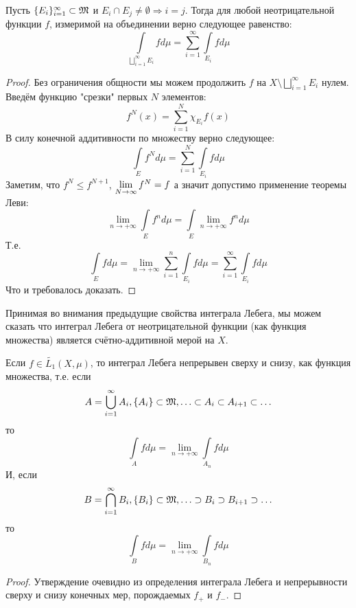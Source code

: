 \begin{theorem}
    Пусть $\{E_i\}_{i = 1}^\infty \subset \mathfrak{M}$ и $E_i \cap E_j \neq \emptyset \Rightarrow i = j$. Тогда для любой неотрицательной функции $f$, измеримой на объединении верно следующее равенство: \[\int\limits_{\bigsqcup\limits_{i = 1}^\infty E_i} fd\mu = \sum\limits_{i = 1}^\infty \int\limits_{E_i} fd\mu\]
\end{theorem}
\begin{proof}
    Без ограничения общности мы можем продолжить $f$ на $X \setminus \bigsqcup\limits_{i = 1}^\infty E_i$ нулем. Введём функцию "срезки" первых $N$ элементов: \[f^N(  x) = \sum\limits_{i = 1}^N \chi_{E_i}f(x)\]
    В силу конечной аддитивности по множеству верно следующее: \[\int\limits_E f^Nd\mu = \sum\limits_{i = 1}^N \int\limits_{E_i} fd\mu\]
    Заметим, что $f^N \leq f^{N + 1}$, $\lim\limits_{N \rightarrow \infty} f^N = f$ а значит допустимо применение теоремы Леви: \[\lim\limits_{n \rightarrow +\infty} \int\limits_{E} f^nd\mu = \int\limits_E \lim\limits_{n \rightarrow +\infty} f^n d\mu\]
    Т.е. \[\int\limits_E fd\mu = \lim\limits_{n \rightarrow +\infty} \sum\limits_{i = 1}^n \int\limits_{E_i} fd\mu = \sum\limits_{i = 1}^\infty \int\limits_{E_i} fd\mu\]
    Что и требовалось доказать.
\end{proof}

\begin{corollary}
    Принимая во внимания предыдущие свойства интеграла Лебега, мы можем сказать что интеграл Лебега от неотрицательной функции (как функция множества) является счётно-аддитивной мерой на $X$.
\end{corollary}

\begin{corollary}
    Если $f \in \widetilde{L_1}(X, \mu)$, то интеграл Лебега непрерывен сверху и снизу, как функция множества, т.е. если \[A = \bigcup\limits_{i = 1}^\infty A_i, \{A_i\} \subset \mathfrak{M}, \ldots \subset A_i \subset A_{i + 1} \subset \ldots\]
    то \[\int\limits_A fd\mu = \lim\limits_{n \rightarrow +\infty} \int\limits_{A_n} fd\mu\]
    И, если \[B = \bigcap\limits_{i = 1}^\infty B_i, \{B_i\} \subset \mathfrak{M}, \ldots \supset B_i \supset B_{i + 1} \supset \ldots\]
    то \[\int\limits_B fd\mu = \lim\limits_{n \rightarrow +\infty} \int\limits_{B_n} fd\mu\]
\end{corollary}
\begin{proof}
    Утверждение очевидно из определения интеграла Лебега и непрерывности сверху и снизу конечных мер, порождаемых $f_+$ и $f_-$.
\end{proof}


